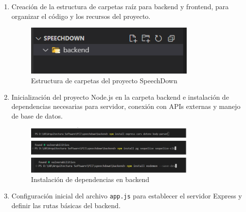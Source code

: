 \begin{enumerate}

\item Creación de la estructura de carpetas raíz para backend y frontend, para organizar el código y los recursos del proyecto.

\vspace{0.5cm}
\begin{figure}[H]
    \centering
    \includegraphics[width=0.8\textwidth]{imagenes/estructura_carpetas.png}
    \caption{Estructura de carpetas del proyecto SpeechDown}
    \label{fig:estructura_carpetas}
\end{figure}
\vspace{0.5cm}

\item Inicialización del proyecto Node.js en la carpeta backend e instalación de dependencias necesarias para servidor, conexión con APIs externas y manejo de base de datos.

\vspace{0.5cm}
\begin{figure}[H]
    \centering
    \includegraphics[width=0.8\textwidth]{imagenes/instalacion_dependencias_backend.png}
    \caption{Instalación de dependencias en backend}
    \label{fig:instalacion_dependencias_backend}
\end{figure}
\vspace{0.5cm}

\item Configuración inicial del archivo \texttt{app.js} para establecer el servidor Express y definir las rutas básicas del backend.


\end{enumerate}
